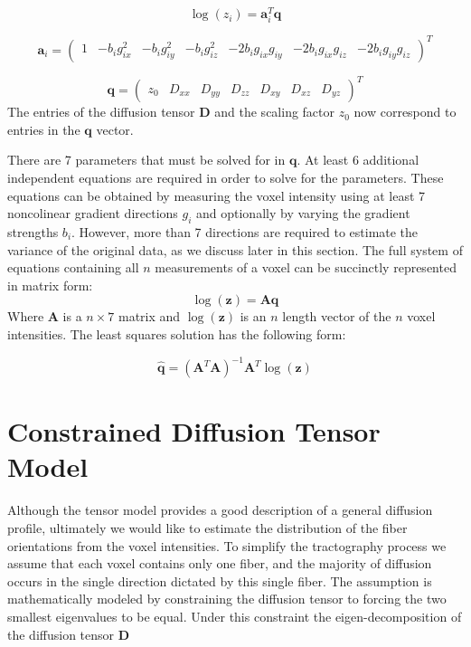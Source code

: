 \begin{equation} \label{eq:logtensormodelexpanded}
\log(z_i)=\mathbf{a}_i^T\mathbf{q}
\end{equation}

\begin{equation} \label{eq:xi}
\mathbf{a}_i=
\left( \begin{array}{ccccccc}
1 & -b_ig_{ix}^2 & -b_ig_{iy}^2 & -b_ig_{iz}^2 & -2b_ig_{ix}g_{iy} & -2b_ig_{ix}g_{iz} & -2b_ig_{iy}g_{iz}
\end{array} \right)^T
\end{equation}


\begin{equation} \label{eq:q}
\mathbf{q}=
\left( \begin{array}{ccccccc}
z_0 & D_{xx} & D_{yy} & D_{zz} & D_{xy} & D_{xz} & D_{yz}
\end{array} \right)^T
\end{equation}
%
%
The entries of the diffusion tensor $\mathbf{D}$ and the scaling factor $z_0$ now correspond to entries in the $\mathbf{q}$ vector.

There are 7 parameters that must be solved for in $\mathbf{q}$.  At least 6 additional independent equations are required in order to solve for the parameters.  These equations can be obtained by measuring the voxel intensity using at least 7 noncolinear gradient directions $g_i$ and optionally by varying the gradient strengths $b_i$.  However, more than 7 directions are required to estimate the variance of the original data, as we discuss later in this section. The full system of equations containing all $n$ measurements of a voxel can be succinctly represented in matrix form:
\begin{equation} \label{eq:fulllogtensor}
\log(\mathbf{z})=\mathbf{A}\mathbf{q}
\end{equation}
Where $\mathbf{A}$ is a $n\times7$ matrix and $\log(\mathbf{z})$ is an $n$ length vector of the $n$ voxel intensities.  The least squares solution has the following form:

\begin{equation} \label{eq:LSUpsilon}
\hat{\mathbf{q}} = (\mathbf{A}^T\mathbf{A})^{-1}\mathbf{A}^T\log(\mathbf{z})
\end{equation}

\section{Constrained Diffusion Tensor Model}
Although the tensor model provides a good description of a general diffusion profile, ultimately we would like to estimate the distribution of the fiber orientations from the voxel intensities.  To simplify the tractography process we assume that each voxel contains only one fiber, and the majority of diffusion occurs in the single direction dictated by this single fiber.  The assumption is mathematically modeled by constraining the diffusion tensor to forcing the two smallest eigenvalues to be equal.  Under this constraint the eigen-decomposition of the diffusion tensor $\mathbf{D}$

